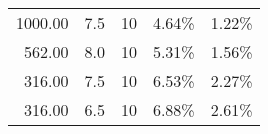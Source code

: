 \documentclass[openany]{now}
\begin{document}
\begin{table}
\begin{center}
\begin{tabular}{rrl|ll}
 1000.00 &                      7.5 &                     10 &   4.64\% &   1.22\% \\
  562.00 &                      8.0 &                     10 &   5.31\% &   1.56\% \\
  316.00 &                      7.5 &                     10 &   6.53\% &   2.27\% \\
  316.00 &                      6.5 &                     10 &   6.88\% &   2.61\% \\

\end{tabular}
\end{center}
\end{table}
\end{document}
